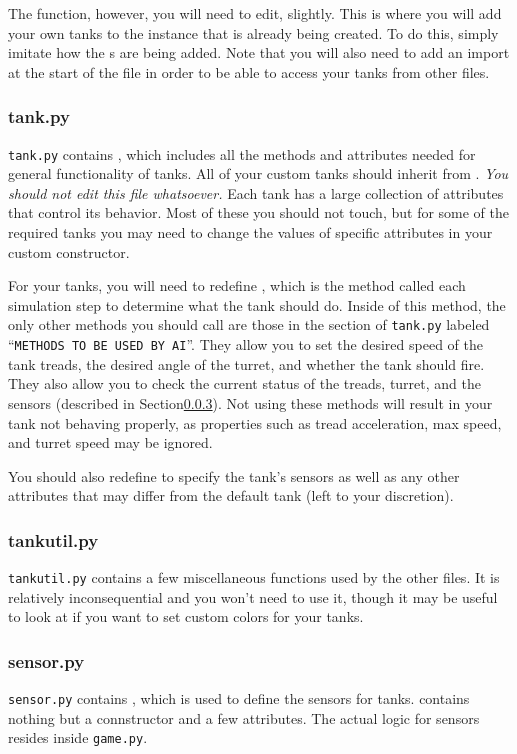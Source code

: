 \documentclass[11pt]{cselabheader}
\begin{document}
The  function, however, you will need to edit, slightly.
This is where you will add your own tanks to the  instance
that is already being created. To do this, simply imitate how the
s are being added. Note that you will also need to add
an import at the start of the file in order to be able to access your tanks from
other files.

\subsubsection{tank.py}
\texttt{tank.py} contains , which includes all the
methods and attributes needed for general functionality of tanks. All of your
custom tanks should inherit from . \emph{You should not edit
this file whatsoever.} Each tank has a large collection of attributes that
control its behavior. Most of these you should not touch, but for some of the
required tanks you may need to change the values of specific attributes in
your custom constructor.

For your tanks, you will need to redefine
, which is the method called each simulation step
to determine what the tank should do. Inside of this method, the only other
methods you should call are those in the section of \texttt{tank.py} labeled
``\texttt{METHODS TO BE USED BY AI}''. They allow you to set the desired speed
of the tank treads, the desired angle of the turret, and whether the tank should
fire. They also allow you to check the current status of the treads, turret, and
the sensors (described in Section\ref{subsubsec:sensor}). Not using these
methods will result in your tank not behaving properly, as properties such as
tread acceleration, max speed, and turret speed may be ignored.

You should also redefine  to specify the tank's sensors as
well as any other attributes that may differ from the default tank (left to your
discretion).

\subsubsection{tankutil.py}
\texttt{tankutil.py} contains a few miscellaneous functions used by the other
files. It is relatively inconsequential and you won't need to use it, though it
may be useful to look at if you want to set custom colors for your tanks.

\subsubsection{sensor.py}
\label{subsubsec:sensor}
\texttt{sensor.py} contains , which is used to define
the sensors for tanks.  contains nothing but a connstructor
and a few attributes. The actual logic for sensors resides inside
\texttt{game.py}.
\end{document}
